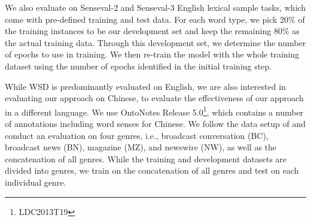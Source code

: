 \documentclass[11pt,a4paper]{article}
\begin{document}
We also evaluate on Senseval-2 and Senseval-3 English lexical sample tasks, which come with pre-defined training and test data. For each word type, we pick 20\% of the training instances to be our development set and keep the remaining 80\% as the actual training data. Through this development set, we determine the number of epochs to use in training. We then re-train the model with the whole training dataset using the number of epochs identified in the initial training step.

While WSD is predominantly evaluated on English, we are also interested in evaluating our approach on Chinese, to evaluate the effectiveness of our approach in a different language. We use OntoNotes Release 5.0\footnote{LDC2013T19}, which contains a number of annotations including word senses for Chinese. We follow the data setup of \citet{pradhan_towards_2013} and conduct an evaluation on four genres, i.e., broadcast conversation (BC), broadcast news (BN), magazine (MZ), and newswire (NW), as well as the concatenation of all genres. While the training and development datasets are divided into genres, we train on the concatenation of all genres and test on each individual genre.
\end{document}
